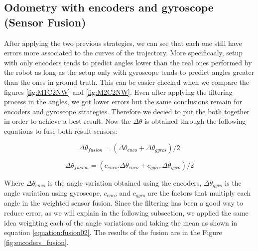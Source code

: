 \documentclass[twoside,conference,a4paper]{IEEEtran}
\begin{document}
\subsection{Odometry with encoders and gyroscope (Sensor Fusion)}
After applying the two previous strategies, we can see that each one still have errors more associated to the curves of the trajectory. More specificaaly, 
setup with only encoders tends to predict angles lower than the real ones performed
by the robot as long as the setup only with gyroscope tends to predict angles greater than the ones in ground truth.
This can be easier checked when we compare the figures \ref{fig:M1C2NW} and \ref{fig:M2C2NW}. Even after applying the 
filtering process in the angles, we got lower errors but the same conclusions remain for encoders and gyroscope 
strategies. Therefore we decied to put the both together in order to achieve a best result. Now the $ \Delta \theta $ is 
obtained through the following equations to fuse both result sensors:

\begin{equation}
  \Delta \theta_{fusion} = (\Delta \theta_{enco} + \Delta \theta_{gyros})/2
  \label{equation:fusion01}
\end{equation}

\begin{equation}
  \Delta \theta_{fusion} = (c_{enco}.\Delta \theta_{enco} + c_{gyro}. \Delta \theta_{gyro})/2
  \label{equation:fusion02}
\end{equation}

Where $ \Delta \theta_{enco} $ is the angle variation obtained using the encoders, $ \Delta \theta_{gyro} $
is the angle variation using gyroscope, $ c_{enco} $ and $ c_{gyro} $ are the factors that multiply each angle 
in the weighted sensor fusion. Since the filtering has been a good way to reduce error, as we will explain in the following subsection, we applied the
same idea weighting each of the angle variations and taking the mean as shown in equation \ref{equation:fusion02}. The
results of the fusion are in the Figure \ref{fig:encoders_fusion}. 
\end{document}
